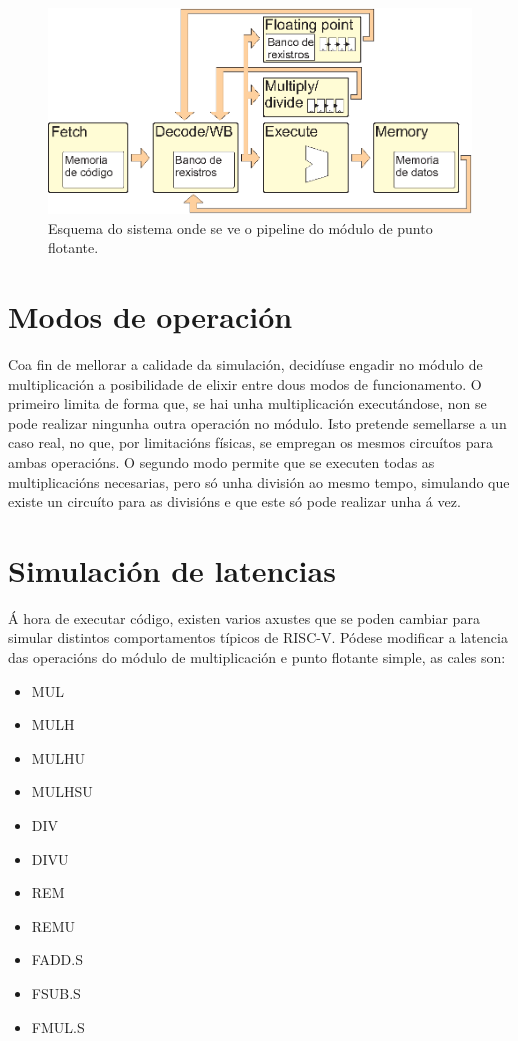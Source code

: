 \begin{figure}[hp!]
  \centering
  \includegraphics[width=\textwidth]{imaxes/pipelinePF.EPS}
  \caption{Esquema do sistema onde se ve o pipeline do módulo de punto flotante.}
  \label{fig:pipelinePF}
\end{figure}

\section{Modos de operación}\label{sec:modos_op}
Coa fin de mellorar a calidade da simulación, decidíuse engadir no módulo de multiplicación a posibilidade de elixir entre dous modos de funcionamento. O primeiro limita de forma que, se hai unha multiplicación executándose, non se pode realizar ningunha outra operación no módulo. Isto pretende semellarse a un caso real, no que, por limitacións físicas, se empregan os mesmos circuítos para ambas operacións. O segundo modo permite que se executen todas as multiplicacións necesarias, pero só unha división ao mesmo tempo, simulando que existe un circuíto para as divisións e que este só pode realizar unha á vez.


\section{Simulación de latencias}\label{sec:sim_latencias}
Á hora de executar código, existen varios axustes que se poden cambiar para simular distintos comportamentos típicos de RISC-V. Pódese modificar a latencia  das operacións do módulo de multiplicación e punto flotante simple, as cales son: 
\begin{itemize}
    \item MUL
    \item MULH
    \item MULHU
    \item MULHSU
    \item DIV
    \item DIVU
    \item REM
    \item REMU
    \item FADD.S
    \item FSUB.S
    \item FMUL.S
\end{itemize}

